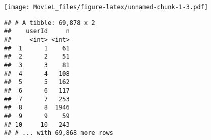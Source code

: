 \documentclass[
]{article}
\newenvironment{Shaded}{\begin{snugshade}}{\end{snugshade}}
\newcommand{\DataTypeTok}[1]{\textcolor[rgb]{0.13,0.29,0.53}{#1}}
\newcommand{\DecValTok}[1]{\textcolor[rgb]{0.00,0.00,0.81}{#1}}
\newcommand{\KeywordTok}[1]{\textcolor[rgb]{0.13,0.29,0.53}{\textbf{#1}}}
\newcommand{\NormalTok}[1]{#1}
\newcommand{\OperatorTok}[1]{\textcolor[rgb]{0.81,0.36,0.00}{\textbf{#1}}}
\newcommand{\StringTok}[1]{\textcolor[rgb]{0.31,0.60,0.02}{#1}}
\begin{document}
\begin{Shaded}
\end{Shaded}

\texttt{[image: MovieL\_files/figure-latex/unnamed-chunk-1-3.pdf]}

\begin{Shaded}
\end{Shaded}

\begin{verbatim}
## # A tibble: 69,878 x 2
##    userId     n
##     <int> <int>
##  1      1    61
##  2      2    51
##  3      3    81
##  4      4   108
##  5      5   162
##  6      6   117
##  7      7   253
##  8      8  1946
##  9      9    59
## 10     10   243
## # ... with 69,868 more rows
\end{verbatim}

\begin{Shaded}
\end{Shaded}
\end{document}
